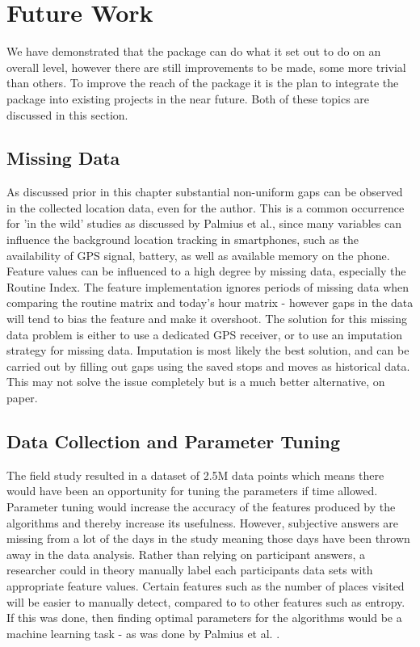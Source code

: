 \clearpage
\section{Future Work}
We have demonstrated that the package can do what it set out to do on an overall level, however there are still improvements to be made, some more trivial than others. To improve the reach of the package it is the plan to integrate the package into existing projects in the near future. Both of these topics are discussed in this section.

\subsection{Missing Data}
As discussed prior in this chapter substantial non-uniform gaps can be observed in the collected location data, even for the author. This is a common occurrence for 'in the wild' studies as discussed by Palmius et al.\cite{palmius2017}, since many variables can influence the background location tracking in smartphones, such as the availability of GPS signal, battery, as well as available memory on the phone. \\

Feature values can be influenced to a high degree by missing data, especially the Routine Index. The feature implementation ignores periods of missing data when comparing the routine matrix and today's hour matrix - however gaps in the data will tend to bias the feature and make it overshoot. The solution for this missing data problem is either to use a dedicated GPS receiver, or to use an imputation strategy for missing data. Imputation is most likely the best solution, and can be carried out by filling out gaps using the saved stops and moves as historical data. This may not solve the issue completely but is a much better alternative, on paper. 

\subsection{Data Collection and Parameter Tuning}
The field study resulted in a dataset of 2.5M data points which means there would have been an opportunity for tuning the parameters if time allowed. Parameter tuning would increase the accuracy of the features produced by the algorithms and thereby increase its usefulness. However, subjective answers are missing from a lot of the days in the study meaning those days have been thrown away in the data analysis. Rather than relying on participant answers, a researcher could in theory manually label each participants data sets with appropriate feature values. Certain features such as the number of places visited will be easier to manually detect, compared to to other features such as entropy. If this was done, then finding optimal parameters for the algorithms would be a machine learning task - as was done by Palmius et al. \cite{palmius2017}. \\

